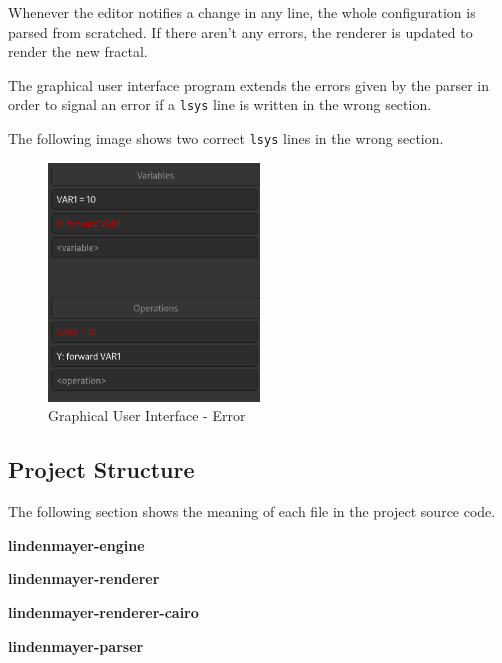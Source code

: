 \documentclass[a4paper]{article}
\begin{document}
Whenever the editor notifies a change in any line, the whole configuration
is parsed from scratched. If there aren't any errors, the renderer is updated to render the new fractal.

The graphical user interface program extends the errors given by the parser
in order to signal an error if a \texttt{lsys} line is written in the wrong section.

The following image shows two correct \texttt{lsys} lines in the wrong section.
\begin{figure}[h]
    \centering
    \includegraphics[width=0.5\textwidth]{media/gui/gui-err.png}
    \caption{Graphical User Interface - Error}
\end{figure}

\pagebreak

\subsection{Project Structure}

The following section shows the meaning of each file in the project source code.

\textbf{lindenmayer-engine}

\textbf{lindenmayer-renderer}

\textbf{lindenmayer-renderer-cairo}

\textbf{lindenmayer-parser}
\end{document}
